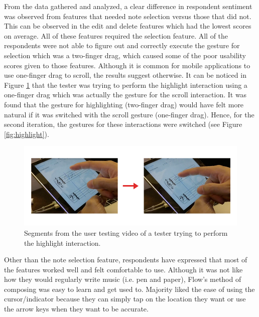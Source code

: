 				From the data gathered and analyzed, a clear difference in respondent sentiment was observed from features that needed note selection versus those that did not. This can be observed in the edit and delete features which had the lowest scores on average. All of these features required the selection feature. All of the respondents were not able to figure out and correctly execute the gesture for selection which was a two-finger drag, which caused some of the poor usability scores given to those features. Although it is common for mobile applications to use one-finger drag to scroll, the results suggest otherwise. It can be noticed in Figure \ref{fig:video_highlight} that the tester was trying to perform the highlight interaction using a one-finger drag which was actually the gesture for the scroll interaction. It was found that the gesture for highlighting (two-finger drag) would have felt more natural if it was switched with the scroll gesture (one-finger drag). Hence, for the second iteration, the gestures for these interactions were switched (see Figure \ref{fig:highlight}).

				\begin{figure}[h]
					\centering
					\includegraphics[scale=0.5]{figures/video_highlight.png}
				    \caption{Segments from the user testing video of a tester trying to perform the highlight interaction.}
				    \label{fig:video_highlight}
				\end{figure}

				Other than the note selection feature, respondents have expressed that most of the features worked well and felt comfortable to use. Although it was not like how they would regularly write music (i.e. pen and paper), Flow's method of composing was easy to learn and get used to. Majority liked the ease of using the cursor/indicator because they can simply tap on the location they want or use the arrow keys when they want to be accurate.

